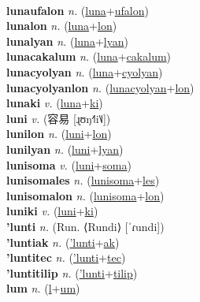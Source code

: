  \label{luna} \\
\textbf{lunaufalon} \textit{n.} (\hyperref[luna]{luna}+\hyperref[ufalon]{ufalon})
 \label{lunaufalon} \\
\textbf{lunalon} \textit{n.} (\hyperref[luna]{luna}+\hyperref[lon]{lon})
 \label{lunalon} \\
\textbf{lunalyan} \textit{n.} (\hyperref[luna]{luna}+\hyperref[lyan]{lyan})
 \label{lunalyan} \\
\textbf{lunacakalum} \textit{n.} (\hyperref[luna]{luna}+\hyperref[cakalum]{cakalum})
 \label{lunacakalum} \\
\textbf{lunacyolyan} \textit{n.} (\hyperref[luna]{luna}+\hyperref[cyolyan]{cyolyan})
 \label{lunacyolyan} \\
\textbf{lunacyolyanlon} \textit{n.} (\hyperref[lunacyolyan]{lunacyolyan}+\hyperref[lon]{lon})
 \label{lunacyolyanlon} \\
\textbf{lunaki} \textit{v.} (\hyperref[luna]{luna}+\hyperref[ki]{ki})
 \label{lunaki} \\
\textbf{luni} \textit{v.} ({\chinese{}容易} [ɻʊŋ˧˥i˥˩])
 \label{luni} \\
\textbf{lunilon} \textit{n.} (\hyperref[luni]{luni}+\hyperref[lon]{lon})
 \label{lunilon} \\
\textbf{lunilyan} \textit{n.} (\hyperref[luni]{luni}+\hyperref[lyan]{lyan})
 \label{lunilyan} \\
\textbf{lunisoma} \textit{v.} (\hyperref[luni]{luni}+\hyperref[soma]{soma})
 \label{lunisoma} \\
\textbf{lunisomales} \textit{n.} (\hyperref[lunisoma]{lunisoma}+\hyperref[les]{les})
 \label{lunisomales} \\
\textbf{lunisomalon} \textit{n.} (\hyperref[lunisoma]{lunisoma}+\hyperref[lon]{lon})
 \label{lunisomalon} \\
\textbf{luniki} \textit{v.} (\hyperref[luni]{luni}+\hyperref[ki]{ki})
 \label{luniki} \\
\textbf{'lunti} \textit{n.} (Run. ⟨Rundi⟩ [ˈɾundi])
 \label{'lunti} \\
\textbf{'luntiak} \textit{n.} (\hyperref['lunti]{'lunti}+\hyperref[ak]{ak})
 \label{'luntiak} \\
\textbf{'luntitec} \textit{n.} (\hyperref['lunti]{'lunti}+\hyperref[tec]{tec})
 \label{'luntitec} \\
\textbf{'luntitilip} \textit{n.} (\hyperref['lunti]{'lunti}+\hyperref[tilip]{tilip})
 \label{'luntitilip} \\
\textbf{lum} \textit{n.} (\hyperref[l]{l}+\hyperref[um]{um})
